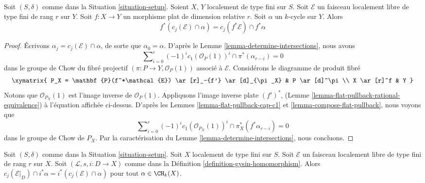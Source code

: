 \begin{lemma}
\label{lemma-flat-pullback-cap-cj}
Soit $(S, \delta)$ comme dans la Situation \ref{situation-setup}.
Soient $X$, $Y$ localement de type fini sur $S$.
Soit $\mathcal{E}$ un faisceau localement libre de type fini de rang $r$ sur $Y$.
Soit $f : X \to Y$ un morphisme plat de dimension relative $r$.
Soit $\alpha$ un $k$-cycle sur $Y$.
Alors
$$
f^*(c_j(\mathcal{E}) \cap \alpha) = c_j(f^*\mathcal{E}) \cap f^*\alpha
$$
\end{lemma}

\begin{proof}
Écrivons $\alpha_j = c_j(\mathcal{E}) \cap \alpha$, de sorte que $\alpha_0 = \alpha$.
D'après le Lemme \ref{lemma-determine-intersections}, nous avons
$$
\sum\nolimits_{i = 0}^r
(-1)^i c_1(\mathcal{O}_P(1))^i \cap
\pi^*(\alpha_{r - i}) = 0
$$
dans le groupe de Chow du fibré projectif
$(\pi : P \to Y, \mathcal{O}_P(1))$
associé à $\mathcal{E}$. Considérons le diagramme de produit fibré
$$
\xymatrix{
P_X = \mathbf{P}(f^*\mathcal{E}) \ar[r]_-{f'} \ar[d]_{\pi_X} &
P \ar[d]^\pi \\
X \ar[r]^f & Y
}
$$
Notons que $\mathcal{O}_{P_X}(1)$ est l'image inverse de $\mathcal{O}_P(1)$.
Appliquons l'image inverse plate $(f')^*$,
(Lemme \ref{lemma-flat-pullback-rational-equivalence}) à l'équation
affichée ci-dessus. D'après les Lemmes \ref{lemma-flat-pullback-cap-c1} et
\ref{lemma-compose-flat-pullback}, nous voyons que
$$
\sum\nolimits_{i = 0}^r
(-1)^i c_1(\mathcal{O}_{P_X}(1))^i \cap
\pi_X^*(f^*\alpha_{r - i}) = 0
$$
dans le groupe de Chow de $P_X$. Par la caractérisation du
Lemme \ref{lemma-determine-intersections}, nous concluons.
\end{proof}

\begin{lemma}
\label{lemma-cap-chern-class-commutes-with-gysin}
Soit $(S, \delta)$ comme dans la Situation \ref{situation-setup}.
Soit $X$ localement de type fini sur $S$.
Soit $\mathcal{E}$ un faisceau localement libre de type fini de rang $r$ sur $X$.
Soit $(\mathcal{L}, s, i : D \to X)$ comme dans la
Définition \ref{definition-gysin-homomorphism}.
Alors $c_j(\mathcal{E}|_D) \cap i^*\alpha = i^*(c_j(\mathcal{E}) \cap \alpha)$
pour tout $\alpha \in \CH_k(X)$.
\end{lemma}

